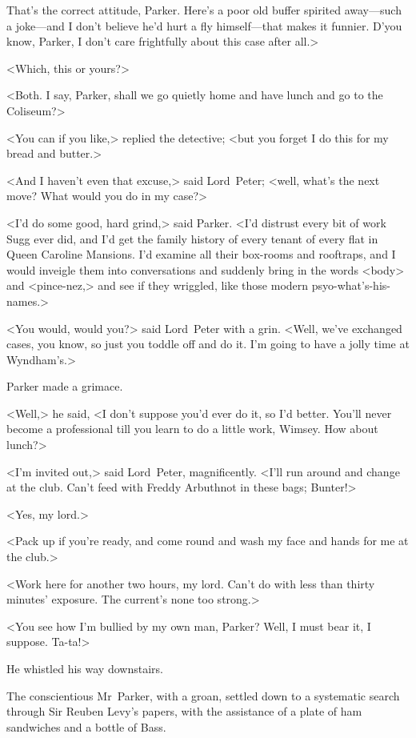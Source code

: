 That's the correct attitude, Parker. Here's a poor old buffer spirited away—such a joke—and I don't believe he'd hurt a fly himself—that makes it funnier. D'you know, Parker, I don't care frightfully about this case after all.>

<Which, this or yours?>

<Both. I say, Parker, shall we go quietly home and have lunch and go to the Coliseum?>

<You can if you like,> replied the detective; <but you forget I do this for my bread and butter.>

<And I haven't even that excuse,> said Lord~Peter; <well, what's the next move? What would you do in my case?>

<I'd do some good, hard grind,> said Parker. <I'd distrust every bit of work Sugg ever did, and I'd get the family history of every tenant of every flat in Queen Caroline Mansions. I'd examine all their box-rooms and rooftraps, and I would inveigle them into conversations and suddenly bring in the words <body> and <pince-nez,> and see if they wriggled, like those modern psyo-what's-his-names.>

<You would, would you?> said Lord~Peter with a grin. <Well, we've exchanged cases, you know, so just you toddle off and do it. I'm going to have a jolly time at Wyndham's.>

Parker made a grimace.

<Well,> he said, <I don't suppose you'd ever do it, so I'd better. You'll never become a professional till you learn to do a little work, Wimsey. How about lunch?>

<I'm invited out,> said Lord~Peter, magnificently. <I'll run around and change at the club. Can't feed with Freddy Arbuthnot in these bags; Bunter!>

<Yes, my lord.>

<Pack up if you're ready, and come round and wash my face and hands for me at the club.>

<Work here for another two hours, my lord. Can't do with less than thirty minutes' exposure. The current's none too strong.>

<You see how I'm bullied by my own man, Parker? Well, I must bear it, I suppose. Ta-ta!>

He whistled his way downstairs.

The conscientious Mr~Parker, with a groan, settled down to a systematic search through Sir Reuben Levy's papers, with the assistance of a plate of ham sandwiches and a bottle of Bass.

